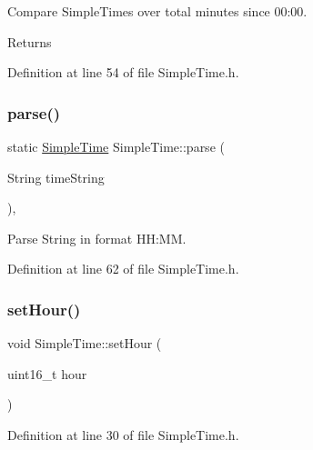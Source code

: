 Compare Simple\+Times over total minutes since 00\+:00. 

\begin{DoxyReturn}{Returns}

\end{DoxyReturn}


Definition at line 54 of file Simple\+Time.\+h.

\mbox{\label{class_simple_time_ad2d133f20de1ac63166308bc77906dfb}} 
\subsubsection{\texorpdfstring{parse()}{parse()}}
{\footnotesize\ttfamily static \mbox{\hyperlink{class_simple_time}{Simple\+Time}} Simple\+Time\+::parse (\begin{DoxyParamCaption}\item[{String}]{time\+String }\end{DoxyParamCaption})\hspace{0.3cm}{\ttfamily [inline]}, {\ttfamily [static]}}



Parse String in format HH\+:MM. 



Definition at line 62 of file Simple\+Time.\+h.

\mbox{\label{class_simple_time_aba0375d3ee93859fdb37b15532c149a4}} 
\subsubsection{\texorpdfstring{setHour()}{setHour()}}
{\footnotesize\ttfamily void Simple\+Time\+::set\+Hour (\begin{DoxyParamCaption}\item[{uint16\+\_\+t}]{hour }\end{DoxyParamCaption})\hspace{0.3cm}{\ttfamily [inline]}}



Definition at line 30 of file Simple\+Time.\+h.

\mbox{\label{class_simple_time_ac5b1e04be8f134f378950dcb6f22f966}} 
